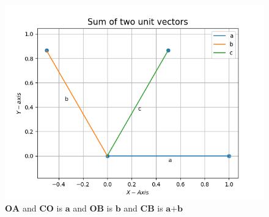 \documentclass{article}
\renewcommand{\vec}[1]{\textbf{#1}}
\begin{document}
\begin{figure}[!h]
	\begin{center}
	\includegraphics[width=\columnwidth]{codes/Python/figs/fig.png}
	\end{center}
	\caption{$\vec{OA}$ and $\vec{CO}$ is $\vec{a}$ and $\vec{OB}$ is $\vec{b}$ and $\vec{CB}$ is $\vec{a+b}$}
	\label{fig:12/10/5/17}
\end{figure}
\end{document}
